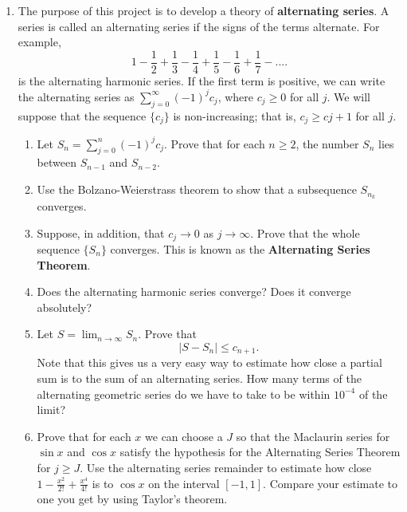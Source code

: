 \documentclass{article}
\begin{document}
\begin{enumerate}
    \item The purpose of this project is to develop a theory of
          \textbf{alternating series}. A series is called an alternating
          series if the signs of the terms alternate. For example,
          \[
              1-\frac{1}{2}+\frac{1}{3}-\frac{1}{4}+\frac{1}{5}
              -\frac{1}{6}+\frac{1}{7}-....
          \]
          is the alternating harmonic series. If the first term is positive,
          we can write the alternating series as $\sum_{j=0}^\infty(-1)^jc_j$,
          where $c_j\geq 0$ for all $j$. We will suppose that the sequence
          $\{c_j\}$ is non-increasing; that is, $c_j\geq c{j+1}$ for all $j$.
          \begin{enumerate}
              \item Let $S_n=\sum_{j=0}^n(-1)^jc_j$. Prove that for each $n\geq 2$,
                    the number $S_n$ lies between $S_{n-1}$ and $S_{n-2}$.
              \item  Use the Bolzano-Weierstrass theorem to show that a subsequence
                    $S_{n_k}$ converges.
              \item Suppose, in addition, that $c_j\to 0$ as $j\to\infty$. Prove that
                    the whole sequence $\{S_n\}$ converges. This is known as the
                    \textbf{Alternating Series Theorem}.
              \item Does the alternating harmonic series converge? Does it converge
                    absolutely?
              \item Let $S=\lim_{n\to\infty}S_n$. Prove that
                    \[
                        \lvert S-S_n\rvert \leq c_{n+1}.
                    \]
                    Note that this gives us a very easy way to estimate how close a
                    partial sum is to the sum of an alternating series. How many terms
                    of the alternating geometric series do we have to take to be within
                    $10^{-4}$ of the limit?
              \item Prove that for each $x$ we can choose a $J$ so that the Maclaurin
                    series for $\sin x$ and $\cos x$ satisfy the hypothesis for the
                    Alternating Series Theorem for $j\geq J$. Use the alternating series
                    remainder to estimate how close $1-\frac{x^2}{2!}+\frac{x^4}{4!}$ is
                    to $\cos x$ on the interval $[-1,1]$. Compare your estimate to one
                    you get by using Taylor's theorem.
          \end{enumerate}
\end{enumerate}
\end{document}
